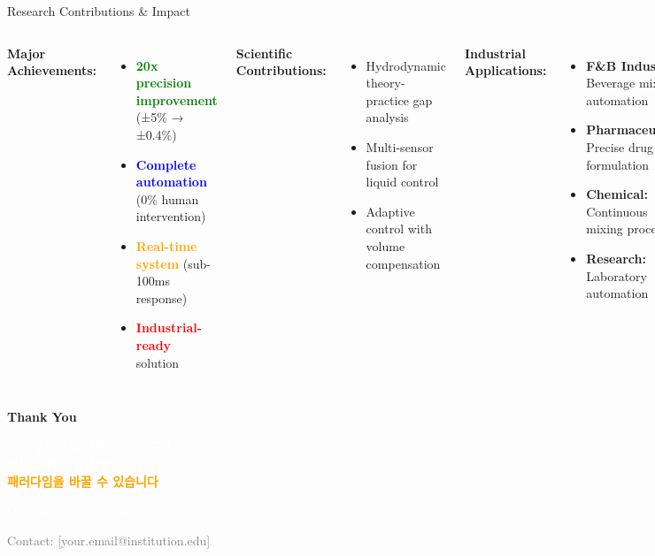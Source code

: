 \documentclass[aspectratio=169]{beamer}
\begin{document}
\begin{frame}{Research Contributions \& Impact}
\begin{columns}[T]
\textbf{Major Achievements:}
\begin{itemize}
    \item \textcolor{green}{\textbf{20x precision improvement}} (±5\% → ±0.4\%)
    \item \textcolor{blue}{\textbf{Complete automation}} (0\% human intervention)
    \item \textcolor{orange}{\textbf{Real-time system}} (sub-100ms response)
    \item \textcolor{red}{\textbf{Industrial-ready}} solution
\end{itemize}

\textbf{Scientific Contributions:}
\begin{itemize}
    \item Hydrodynamic theory-practice gap analysis
    \item Multi-sensor fusion for liquid control
    \item Adaptive control with volume compensation
\end{itemize}

\textbf{Industrial Applications:}
\begin{itemize}
    \item \textbf{F\&B Industry:} Beverage mixing automation
    \item \textbf{Pharmaceutical:} Precise drug formulation
    \item \textbf{Chemical:} Continuous mixing processes
    \item \textbf{Research:} Laboratory automation
\end{itemize}

\begin{alertblock}{Economic Impact}
\textbf{Potential savings:} \$2.3M annually\\
\textbf{ROI:} 6-month payback period
\end{alertblock}
\end{columns}
\end{frame}

\begin{frame}[standout]
\textbf{Thank You}

\vspace{2em}

\large
\textcolor{white}{1.5g 설탕으로 시작한 이 연구가}\\
\textcolor{white}{전체 액체 혼합 산업의}\\
\textcolor{orange}{\textbf{패러다임을 바꿀 수 있습니다}}

\vspace{2em}

\normalsize
\textcolor{white}{Questions \& Discussion}

\vspace{1em}

\footnotesize
\textcolor{gray}{Contact: [your.email@institution.edu]}
\end{frame}
\end{document}
